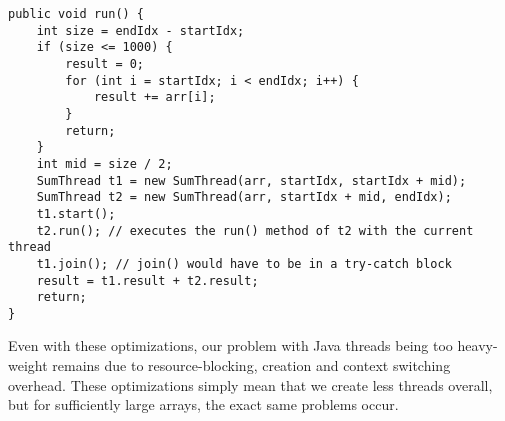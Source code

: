 \documentclass[main.tex]{subfiles}
\begin{document}
\begin{verbatim}
public void run() {
    int size = endIdx - startIdx;
    if (size <= 1000) {
        result = 0;
        for (int i = startIdx; i < endIdx; i++) {
            result += arr[i];
        }
        return;
    }
    int mid = size / 2;
    SumThread t1 = new SumThread(arr, startIdx, startIdx + mid);
    SumThread t2 = new SumThread(arr, startIdx + mid, endIdx);
    t1.start();
    t2.run(); // executes the run() method of t2 with the current thread
    t1.join(); // join() would have to be in a try-catch block
    result = t1.result + t2.result;
    return;
}
\end{verbatim}

\noindent Even with these optimizations, our problem with Java threads being too heavy-weight remains due to resource-blocking, creation and context switching overhead. These optimizations simply mean that we create less threads overall, but for sufficiently large arrays, the exact same problems occur.
\end{document}
